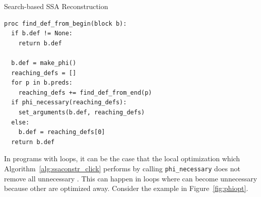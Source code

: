 \begin{algorithm}
	\caption{Search-based SSA Reconstruction}
	\label{alg:ssaconstr_click}

\begin{verbatim}
proc find_def_from_begin(block b):
  if b.def != None:
    return b.def

  b.def = make_phi()
  reaching_defs = []
  for p in b.preds:
    reaching_defs += find_def_from_end(p)
  if phi_necessary(reaching_defs):
    set_arguments(b.def, reaching_defs)
  else:
    b.def = reaching_defs[0]
  return b.def
\end{verbatim}
\end{algorithm}

In programs with loops, it can be the case that the local optimization which Algorithm~\ref{alg:ssaconstr_click} performs by calling \verb|phi_necessary| does not remove all unnecessary \phifuns. 
This can happen in loops where \phifuns can become unnecessary because other \phifuns are optimized away. 
Consider the example in Figure~\ref{fig:phiopt}.
